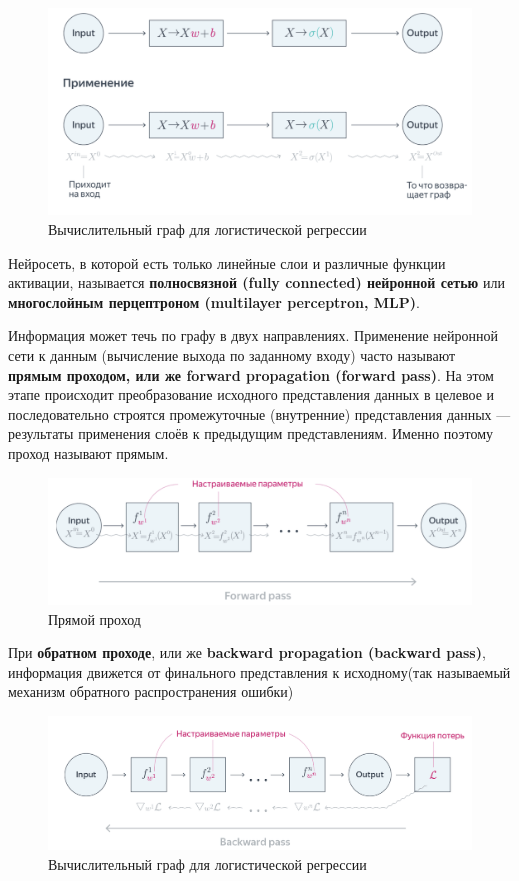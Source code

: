 \begin{figure}[h]
    \centering
    \includegraphics[width=0.8\linewidth]{Images/image1.png}

    \caption{Вычислительный граф для логистической регрессии}
    \label{fig:ваш_ярлык}
\end{figure}

Нейросеть, в которой есть только линейные слои и различные функции активации, называется \textbf{полносвязной (fully connected) нейронной сетью} или \textbf{многослойным перцептроном (multilayer perceptron, MLP)}.

Информация может течь по графу в двух направлениях. Применение нейронной сети к данным (вычисление выхода по заданному входу) часто называют \textbf{прямым проходом, или же forward propagation (forward pass)}.
 На этом этапе происходит преобразование исходного представления данных в целевое и последовательно строятся промежуточные (внутренние) представления данных — результаты применения слоёв к предыдущим представлениям. Именно поэтому проход называют прямым.

\begin{figure}[h]
    \centering
    \includegraphics[width=0.8\linewidth]{Images/image2.png}

    \caption{Прямой проход}
    \label{fig:ваш_ярлык}
\end{figure}

При \textbf{обратном проходе}, или же \textbf{backward propagation (backward pass)}, информация движется от финального представления к исходному(так называемый механизм обратного распространения ошибки)

\begin{figure}[H]
    \centering
    \includegraphics[width=0.8\linewidth]{Images/image3.png}
    \caption{Вычислительный граф для логистической регрессии}
    \label{fig:ваш_ярлык}
\end{figure}


